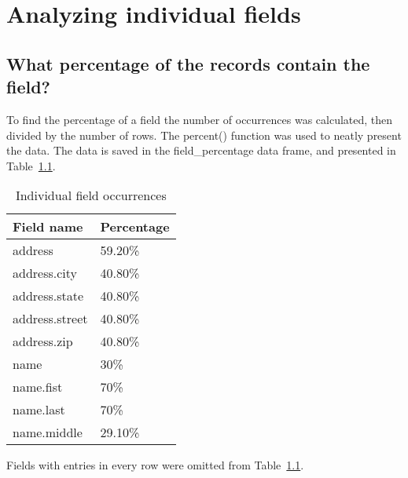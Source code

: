 \documentclass[12pt,fleqn]{report} %
\begin{document}

\chapter{Analyzing individual fields}

\section{What percentage of the records contain the field?}

To find the percentage of a field the number of occurrences was calculated, then divided by the number of rows. The percent() function was used to neatly present the data. The data is saved in the field\_percentage data frame, and presented in Table~\ref{field-percent}.  

\begin{table}[h]
\centering
\caption{Individual field occurrences}
\label{field-percent}
\begin{tabular}{ll} \\ \hline \hline
\textbf{Field name} & \textbf{Percentage} \\ \hline
address             & 59.20\%             \\
address.city        & 40.80\%             \\
address.state       & 40.80\%             \\
address.street      & 40.80\%             \\
address.zip         & 40.80\%             \\
name                & 30\%                \\
name.fist           & 70\%                \\
name.last           & 70\%                \\
name.middle         & 29.10\%  \\ \hline \hline          
\end{tabular}
\end{table}

Fields with entries in every row were omitted from Table~\ref{field-percent}.
\end{document}
